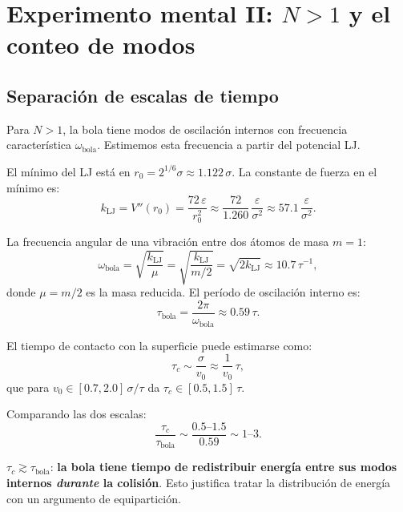 \documentclass[11pt, a4paper]{article}
\begin{document}
\section{Experimento mental II: \texorpdfstring{$N > 1$}{N mayor que 1} y el conteo de modos}

\subsection{Separación de escalas de tiempo}

Para $N > 1$, la bola tiene modos de oscilación internos con frecuencia
característica $\omega_\text{bola}$. Estimemos esta frecuencia a partir del
potencial LJ.

El mínimo del LJ está en $r_0 = 2^{1/6}\sigma \approx 1.122\,\sigma$.
La constante de fuerza en el mínimo es:
\begin{equation}
  k_\text{LJ} = V''(r_0) = \frac{72\,\varepsilon}{r_0^2}
               \approx \frac{72}{1.260}\,\frac{\varepsilon}{\sigma^2}
               \approx 57.1\,\frac{\varepsilon}{\sigma^2}.
\end{equation}

La frecuencia angular de una vibración entre dos átomos de masa $m=1$:
\begin{equation}
  \omega_\text{bola} = \sqrt{\frac{k_\text{LJ}}{\mu}}
  = \sqrt{\frac{k_\text{LJ}}{m/2}} = \sqrt{2k_\text{LJ}}
  \approx 10.7\,\tau^{-1},
\end{equation}
donde $\mu = m/2$ es la masa reducida. El período de oscilación interno es:
\begin{equation}
  \tau_\text{bola} = \frac{2\pi}{\omega_\text{bola}} \approx 0.59\,\tau.
\end{equation}

El tiempo de contacto con la superficie puede estimarse como:
\begin{equation}
  \tau_c \sim \frac{\sigma}{v_0} \approx \frac{1}{v_0}\,\tau,
\end{equation}
que para $v_0 \in [0.7, 2.0]\,\sigma/\tau$ da $\tau_c \in [0.5, 1.5]\,\tau$.

Comparando las dos escalas:
\begin{equation}
  \frac{\tau_c}{\tau_\text{bola}} \sim \frac{0.5\text{--}1.5}{0.59} \sim 1\text{--}3.
\end{equation}

\begin{mdframed}[style=pregunta]
$\tau_c \gtrsim \tau_\text{bola}$: \textbf{la bola tiene tiempo de redistribuir
energía entre sus modos internos \emph{durante} la colisión}. Esto justifica
tratar la distribución de energía con un argumento de equipartición.
\end{mdframed}
\end{document}
